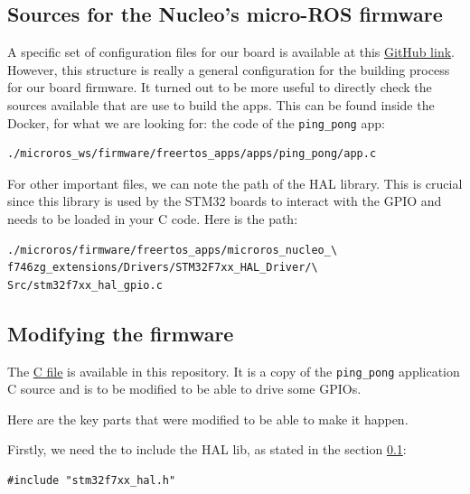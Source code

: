 \documentclass[10pt]{article}
\begin{document}
\subsection{Sources for the Nucleo's micro-ROS firmware}
\label{sec:sourc-nucl-micro}
A specific set of configuration files for our board is available at this \href{https://github.com/micro-ROS/micro_ros_setup/tree/humble/config/freertos/nucleo_f746zg}{GitHub link}.
However, this structure is really a general configuration for the building process for our board firmware. It turned out to be more useful to directly check the sources available that are use to build the apps.
This can be found inside the Docker, for what we are looking for: the code of the \verb|ping_pong| app:
\begin{tcolorbox}
\begin{verbatim}
./microros_ws/firmware/freertos_apps/apps/ping_pong/app.c
\end{verbatim}
\end{tcolorbox}

For other important files, we can note the path of the HAL library. This is crucial since this library is used by the STM32 boards to interact with the GPIO and needs to be loaded in your C code. Here is the path:
\begin{tcolorbox}
\begin{verbatim}
./microros/firmware/freertos_apps/microros_nucleo_\
f746zg_extensions/Drivers/STM32F7xx_HAL_Driver/\
Src/stm32f7xx_hal_gpio.c
\end{verbatim}
\end{tcolorbox}

\subsection{Modifying the firmware}
\label{sec:modifying-firmware}
The \href{https://gitlab.com/nucleo-144/documentation/-/blob/main/src/ping_pong.c}{C file} is available in this repository. It is a copy of the \verb|ping_pong| application C source and is to be modified to be able to drive some GPIOs.

Here are the key parts that were modified to be able to make it happen.

Firstly, we need the to include the HAL lib, as stated in the section \ref{sec:sourc-nucl-micro}:
\begin{tcolorbox}
\begin{verbatim}
#include "stm32f7xx_hal.h"
\end{verbatim}
\end{tcolorbox}
\end{document}
